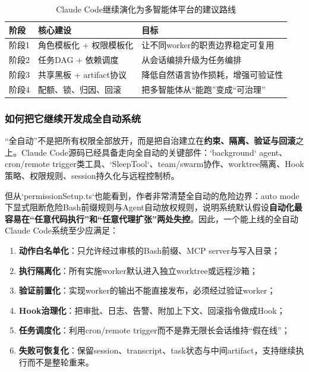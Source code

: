 \documentclass[12pt,a4paper]{article}
\begin{document}
\begin{table}[H]
\centering
\caption{Claude Code继续演化为多智能体平台的建议路线}
\begin{tabular}{p{2.8cm}p{4.0cm}p{5.2cm}}
\toprule
\textbf{阶段} & \textbf{核心建设} & \textbf{目标} \\
\midrule
阶段1 & 角色模板化 + 权限模板化 & 让不同worker的职责边界稳定可复用 \\
阶段2 & 任务DAG + 依赖调度 & 从会话编排升级为任务编排 \\
阶段3 & 共享黑板 + artifact协议 & 降低自然语言协作损耗，增强可验证性 \\
阶段4 & 配额、锁、归因、回滚 & 把多智能体从“能跑”变成“可治理” \\
\bottomrule
\end{tabular}
\end{table}

\subsubsection{如何把它继续开发成全自动系统}

“全自动”不是把所有权限全部放开，而是把自治建立在\textbf{约束、隔离、验证与回滚}之上。Claude Code源码已经具备走向全自动的关键部件：`background` agent、cron/remote trigger类工具、`SleepTool`、team/swarm协作、worktree隔离、Hook策略、权限规则、session持久化与远程控制桥。

但从`permissionSetup.ts`也能看到，作者非常清楚全自动的危险边界：auto mode下显式阻断危险Bash前缀规则与Agent自动放权规则，说明系统默认假设\textbf{自动化最容易在“任意代码执行”和“任意代理扩张”两处失控}。因此，一个能上线的全自动Claude Code系统至少应满足：
\begin{enumerate}
    \item \textbf{动作白名单化}：只允许经过审核的Bash前缀、MCP server与写入目录；
    \item \textbf{执行隔离化}：所有实施worker默认进入独立worktree或远程沙箱；
    \item \textbf{验证前置化}：实现worker的输出不能直接发布，必须经过验证worker；
    \item \textbf{Hook治理化}：把审批、日志、告警、附加上下文、回滚指令做成Hook；
    \item \textbf{任务调度化}：利用cron/remote trigger而不是靠无限长会话维持“假在线”；
    \item \textbf{失败可恢复化}：保留session、transcript、task状态与中间artifact，支持继续执行而不是整轮重来。
\end{enumerate}
\end{document}
